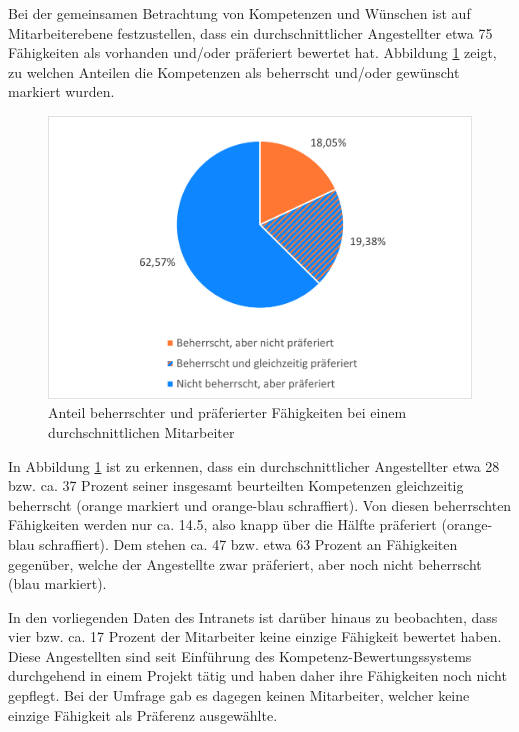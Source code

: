 Bei der gemeinsamen Betrachtung von Kompetenzen und Wünschen ist auf Mitarbeiterebene festzustellen, dass ein durchschnittlicher Angestellter etwa 75 Fähigkeiten als vorhanden und/oder präferiert bewertet hat. Abbildung \ref{fig:ergebnisse:analyse:abb3} zeigt, zu welchen Anteilen die Kompetenzen als beherrscht und/oder gewünscht markiert wurden.

\begin{figure}[h]
	\centering
	\includegraphics[width=1\textwidth]{gfx/auswertung-anteil-an-faehigkeiten.png}
	\caption{Anteil beherrschter und präferierter Fähigkeiten bei einem durchschnittlichen Mitarbeiter}
	\label{fig:ergebnisse:analyse:abb3}
\end{figure}

In Abbildung \ref{fig:ergebnisse:analyse:abb3} ist zu erkennen, dass ein durchschnittlicher Angestellter etwa 28 bzw. ca. 37 Prozent seiner insgesamt beurteilten Kompetenzen gleichzeitig beherrscht (orange markiert und orange-blau schraffiert). Von diesen beherrschten Fähigkeiten werden nur ca. 14.5, also knapp über die Hälfte präferiert (orange-blau schraffiert). Dem stehen ca. 47 bzw. etwa 63 Prozent an Fähigkeiten gegenüber, welche der Angestellte zwar präferiert, aber noch nicht beherrscht (blau markiert).

In den vorliegenden Daten des Intranets ist darüber hinaus zu beobachten, dass vier bzw. ca. 17 Prozent der Mitarbeiter keine einzige Fähigkeit bewertet haben. Diese Angestellten sind seit Einführung des Kompetenz-Bewertungssystems durchgehend in einem Projekt tätig und haben daher ihre Fähigkeiten noch nicht gepflegt. Bei der Umfrage gab es dagegen keinen Mitarbeiter, welcher keine einzige Fähigkeit als Präferenz ausgewählte.

